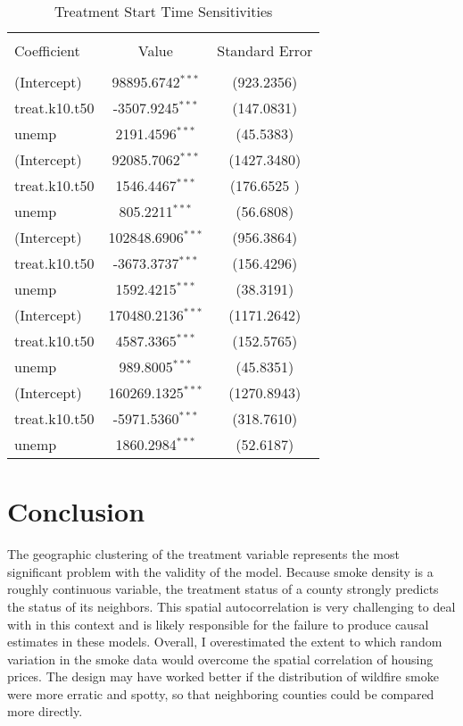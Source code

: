 \documentclass[12pt]{article}
\begin{document}
\begin{table}[!htbp] \centering 
  \caption{Treatment Start Time Sensitivities} 
  \label{} 
\begin{tabular}{@{\extracolsep{5pt}}lcc}\\[-1.8ex] \\
Coefficient & Value & Standard Error \\  
\hline \\[-1.8ex]
(Intercept)    & 98895.6742$^{***}$ & (923.2356) \\
treat.k10.t50 & -3507.9245$^{***}$ & (147.0831) \\
unemp           & 2191.4596$^{***}$ & (45.5383) \\
(Intercept)    &  92085.7062$^{***}$ &  (1427.3480)\\
treat.k10.t50 &   1546.4467$^{***}$ & (176.6525 )\\
unemp            & 805.2211$^{***}$ & (56.6808) \\
(Intercept)     & 102848.6906$^{***}$ & (956.3864)\\
treat.k10.t50   & -3673.3737$^{***}$ & (156.4296)\\
unemp            & 1592.4215$^{***}$ &  (38.3191) \\
(Intercept)    & 170480.2136$^{***}$ & (1171.2642) \\
treat.k10.t50   & 4587.3365$^{***}$ & (152.5765)\\
unemp           &  989.8005$^{***}$ & (45.8351) \\
(Intercept)   & 160269.1325$^{***}$ & (1270.8943) \\
treat.k10.t50 &   -5971.5360$^{***}$ &  (318.7610) \\
unemp         &   1860.2984$^{***}$ & (52.6187) \\
\end{tabular}
\end{table}

\section{Conclusion}

The geographic clustering of the treatment variable represents the most significant 
problem with the validity of the model.  Because smoke density is a roughly continuous
variable, the treatment status of a county strongly predicts the status of its
neighbors.  This spatial autocorrelation is very challenging to deal with in this context and is likely responsible for the failure to produce causal estimates in these models.  Overall, I overestimated the extent to which random variation in the smoke data would overcome the spatial correlation of housing prices.  The design may have worked better if the distribution of wildfire smoke were more erratic and spotty, so that neighboring counties could be compared more directly. 
\end{document}
